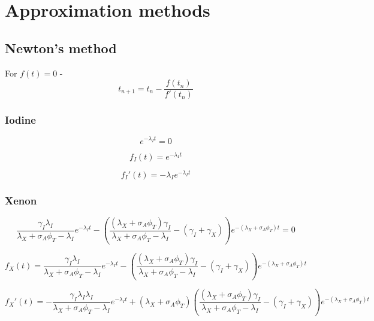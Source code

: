\documentclass[11pt,a4paper]{article}
\begin{document}
\newpage 

\section{Approximation methods}
\subsection{Newton's method}

For $f(t) = 0$ - 
\begin{equation*}
    t_{n+1} = t_{n} - \frac{f(t_{n})}{f'(t_{n})}
\end{equation*}

\subsubsection{Iodine}
\begin{equation}
        e^{-\lambda_I t} = 0
\end{equation}

\begin{equation}
    f_I(t)=e^{-\lambda_I t}
\end{equation}

\begin{equation}
    f_I'(t)=-\lambda_I e^{-\lambda_I t}
\end{equation}

\subsubsection{Xenon}
\begin{equation} 
        \frac{\gamma_I\lambda_I}{\lambda_X+\sigma_A\phi_T-\lambda_I}e^{-\lambda_I t}
        -(\frac{(\lambda_X+\sigma_A\phi_T)\gamma_I}{\lambda_X+\sigma_A\phi_T-\lambda_I}
        -(\gamma_I+\gamma_X))e^{-(\lambda_X+\sigma_A\phi_T)t}
        = 0
\end{equation}

\begin{equation} 
        f_X(t) =
        \frac{\gamma_I\lambda_I}{\lambda_X+\sigma_A\phi_T-\lambda_I}e^{-\lambda_I t}
        -(\frac{(\lambda_X+\sigma_A\phi_T)\gamma_I}{\lambda_X+\sigma_A\phi_T-\lambda_I}
        -(\gamma_I+\gamma_X))e^{-(\lambda_X+\sigma_A\phi_T)t}
\end{equation}

\begin{equation} 
        f_X'(t) =
        -\frac{\gamma_I\lambda_I\lambda_I}{\lambda_X+\sigma_A\phi_T-\lambda_I}e^{-\lambda_I t}
        +(\lambda_X+\sigma_A\phi_T)(\frac{(\lambda_X+\sigma_A\phi_T)\gamma_I}{\lambda_X+\sigma_A\phi_T-\lambda_I}
        -(\gamma_I+\gamma_X))e^{-(\lambda_X+\sigma_A\phi_T)t}
\end{equation}
\end{document}
